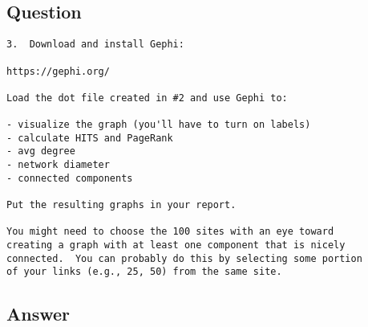 \documentclass[letterpaper,11pt]{article}
\begin{document}
\subsection*{Question}

\begin{verbatim}
3.  Download and install Gephi:

https://gephi.org/

Load the dot file created in #2 and use Gephi to:

- visualize the graph (you'll have to turn on labels)
- calculate HITS and PageRank
- avg degree
- network diameter
- connected components

Put the resulting graphs in your report.

You might need to choose the 100 sites with an eye toward
creating a graph with at least one component that is nicely
connected.  You can probably do this by selecting some portion
of your links (e.g., 25, 50) from the same site.  
\end{verbatim}

\newpage
\subsection*{Answer}


\clearpage


\end{document}
